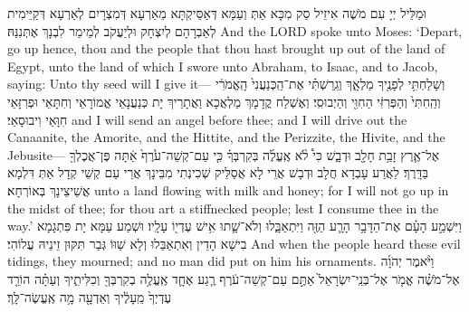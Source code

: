 {{וּמַלֵּיל יְיָ עִם מֹשֶׁה אִיזֵיל סַק מִכָּא אַתְּ וְעַמָּא דְּאַסֵּיקְתָּא מֵאַרְעָא דְּמִצְרָיִם לְאַרְעָא דְּקַיֵּימִית לְאַבְרָהָם לְיִצְחָק וּלְיַעֲקֹב לְמֵימַר לִבְנָךְ אֶתְּנִנַּהּ׃}
{And the LORD spoke unto Moses: ‘Depart, go up hence, thou and the people that thou hast brought up out of the land of Egypt, unto the land of which I swore unto Abraham, to Isaac, and to Jacob, saying: Unto thy seed will I give it—}{}
{וְשָׁלַחְתִּ֥י לְפָנֶ֖יךָ מַלְאָ֑ךְ וְגֵֽרַשְׁתִּ֗י אֶת־הַֽכְּנַעֲנִי֙ הָֽאֱמֹרִ֔י וְהַֽחִתִּי֙ וְהַפְּרִזִּ֔י הַחִוִּ֖י וְהַיְבוּסִֽי׃
}
{וְאֶשְׁלַח קֳדָמָךְ מַלְאֲכָא וַאֲתָרֵיךְ יָת כְּנַעֲנָאֵי אֱמוֹרָאֵי וְחִתָּאֵי וּפְרִזָּאֵי חִוָּאֵי וִיבוּסָאֵי׃}
{and I will send an angel before thee; and I will drive out the Canaanite, the Amorite, and the Hittite, and the Perizzite, the Hivite, and the Jebusite—}{}
{אֶל־אֶ֛רֶץ זָבַ֥ת חָלָ֖ב וּדְבָ֑שׁ כִּי֩ לֹ֨א אֶֽעֱלֶ֜ה בְּקִרְבְּךָ֗ כִּ֤י עַם־קְשֵׁה־עֹ֙רֶף֙ אַ֔תָּה פֶּן־אֲכֶלְךָ֖ בַּדָּֽרֶךְ׃
}
{לַאֲרַע עָבְדָא חֲלָב וּדְבָשׁ אֲרֵי לָא אֲסַלֵּיק שְׁכִינְתִי מִבֵּינָךְ אֲרֵי עַם קְשֵׁי קְדָל אַתְּ דִּלְמָא אֲשֵׁיצֵינָךְ בְּאוֹרְחָא׃}
{unto a land flowing with milk and honey; for I will not go up in the midst of thee; for thou art a stiffnecked people; lest I consume thee in the way.’}{}
{וַיִּשְׁמַ֣ע הָעָ֗ם אֶת־הַדָּבָ֥ר הָרָ֛ע הַזֶּ֖ה וַיִּתְאַבָּ֑לוּ וְלֹא־שָׁ֛תוּ אִ֥ישׁ עֶדְי֖וֹ עָלָֽיו׃
}
{וּשְׁמַע עַמָּא יָת פִּתְגָמָא בִישָׁא הָדֵין וְאִתְאַבַּלוּ וְלָא שַׁוּוֹ גְּבַר תִּקּוּן זֵינֵיהּ עֲלוֹהִי׃}
{And when the people heard these evil tidings, they mourned; and no man did put on him his ornaments.}{}
{וַיֹּ֨אמֶר יְהֹוָ֜ה אֶל־מֹשֶׁ֗ה אֱמֹ֤ר אֶל־בְּנֵֽי־יִשְׂרָאֵל֙ אַתֶּ֣ם עַם־קְשֵׁה־עֹ֔רֶף רֶ֧גַע אֶחָ֛ד אֶֽעֱלֶ֥ה בְקִרְבְּךָ֖ וְכִלִּיתִ֑יךָ וְעַתָּ֗ה הוֹרֵ֤ד עֶדְיְךָ֙ מֵֽעָלֶ֔יךָ וְאֵדְעָ֖ה מָ֥ה אֶֽעֱשֶׂה־לָּֽךְ׃
}}
